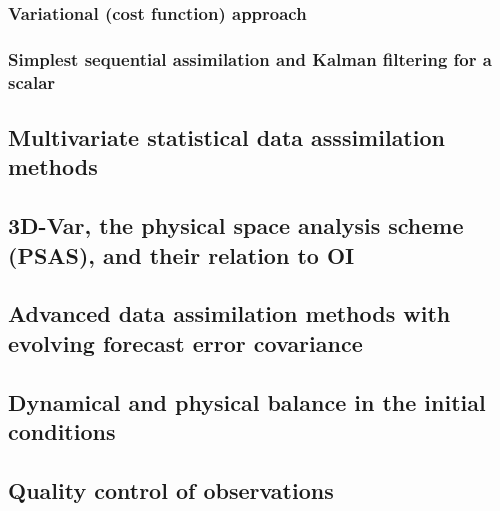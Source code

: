 \subsubsection{Variational (cost function) approach}
\label{subs:squares:variational}

\subsubsection{Simplest sequential assimilation and Kalman filtering for a scalar}
\label{subs:squares:sequential}

\subsection{Multivariate statistical data asssimilation methods}
\label{sub:data_assimilation:multivar}

\subsection{3D-Var, the physical space analysis scheme (PSAS), and their relation to OI}
\label{sub:data_assimilation:3d-var}

\subsection{Advanced data assimilation methods with evolving forecast error covariance}
\label{sub:data_assimilation:advanced}

\subsection{Dynamical and physical balance in the initial conditions}
\label{sub:data_assimilation:balance}

\subsection{Quality control of observations}
\label{sub:data_assimilation:quality}



